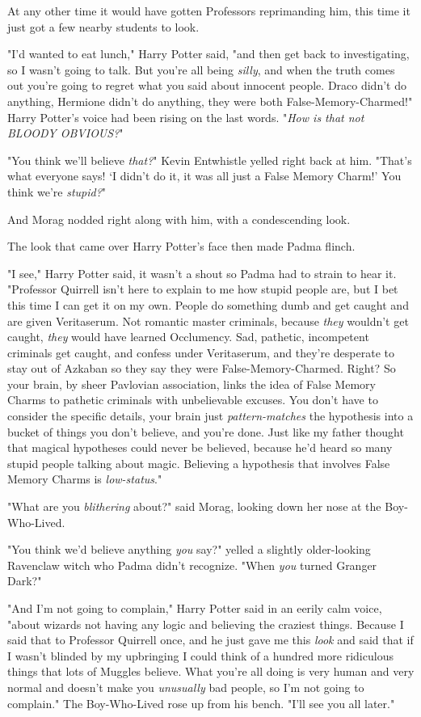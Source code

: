 At any other time it would have gotten Professors reprimanding him, this time 
it just got a few nearby students to look.

"I'd wanted to eat lunch," Harry Potter said, "and then get back to 
investigating, so I wasn't going to talk. But you're all being \emph{silly}, 
and when the truth comes out you're going to regret what you said about 
innocent people. Draco didn't do anything, Hermione didn't do anything, they 
were both False-Memory-Charmed!" Harry Potter's voice had been rising on the 
last words. "\emph{How is that not BLOODY OBVIOUS?}"

"You think we'll believe \emph{that?}" Kevin Entwhistle yelled right back at 
him. "That's what everyone says! `I didn't do it, it was all just a False 
Memory Charm!' You think we're \emph{stupid?}"

And Morag nodded right along with him, with a condescending look.

The look that came over Harry Potter's face then made Padma flinch.

"I see," Harry Potter said, it wasn't a shout so Padma had to strain to hear 
it. "Professor Quirrell isn't here to explain to me how stupid people are, but 
I bet this time I can get it on my own. People do something dumb and get caught 
and are given Veritaserum. Not romantic master criminals, because \emph{they} 
wouldn't get caught, \emph{they} would have learned Occlumency. Sad, pathetic, 
incompetent criminals get caught, and confess under Veritaserum, and they're 
desperate to stay out of Azkaban so they say they were False-Memory-Charmed. 
Right? So your brain, by sheer Pavlovian association, links the idea of False 
Memory Charms to pathetic criminals with unbelievable excuses. You don't have 
to consider the specific details, your brain just \emph{pattern-matches} the 
hypothesis into a bucket of things you don't believe, and you're done. Just 
like my father thought that magical hypotheses could never be believed, because 
he'd heard so many stupid people talking about magic. Believing a hypothesis 
that involves False Memory Charms is \emph{low-status}."

"What are you \emph{blithering} about?" said Morag, looking down her nose at 
the Boy-Who-Lived.

"You think we'd believe anything \emph{you} say?" yelled a slightly 
older-looking Ravenclaw witch who Padma didn't recognize. "When \emph{you} 
turned Granger Dark?"

"And I'm not going to complain," Harry Potter said in an eerily calm voice, 
"about wizards not having any logic and believing the craziest things. Because 
I said that to Professor Quirrell once, and he just gave me this \emph{look} 
and said that if I wasn't blinded by my upbringing I could think of a hundred 
more ridiculous things that lots of Muggles believe. What you're all doing is 
very human and very normal and doesn't make you \emph{unusually} bad people, so 
I'm not going to complain." The Boy-Who-Lived rose up from his bench. "I'll see 
you all later."

